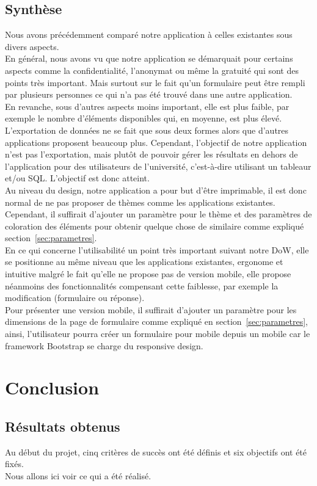 \documentclass{sigplanconf}
\begin{document}
\subsection{Synthèse}
Nous avons précédemment comparé notre application à celles existantes sous divers aspects.\\ En général, nous avons vu que notre application se démarquait pour certains aspects comme la confidentialité, l’anonymat ou même la gratuité qui sont des points très important. Mais surtout sur le fait qu'un formulaire peut être rempli par plusieurs personnes ce qui n'a pas été trouvé dans une autre application.\\
En revanche, sous d’autres aspects moins important, elle est plus faible, par exemple le nombre d’éléments disponibles qui, en moyenne, est plus élevé. L’exportation de données ne se fait que sous deux formes alors que d’autres applications proposent beaucoup plus. Cependant, l’objectif de notre application n’est pas l’exportation, mais plutôt de pouvoir gérer les résultats en dehors de l’application pour des utilisateurs de l'université, c'est-à-dire utilisant un tableaur et/ou SQL. L’objectif est donc atteint. \\
Au niveau du design, notre application a pour but d’être imprimable, il est donc normal de ne pas proposer de thèmes comme les applications existantes. Cependant, il suffirait d'ajouter un paramètre pour le thème et des paramètres de coloration des éléments pour obtenir quelque chose de similaire comme expliqué section~\ref{sec:parametres}.\\
En ce qui concerne l’utilisabilité un point très important suivant notre DoW, elle se positionne au même niveau que les applications existantes, ergonome et intuitive malgré le fait qu’elle ne propose pas de version mobile, elle propose néanmoins des fonctionnalités compensant cette faiblesse, par exemple la modification (formulaire ou réponse).\\
Pour présenter une version mobile, il suffirait d'ajouter un paramètre pour les dimensions de la page de formulaire comme expliqué en section~\ref{sec:parametres}, ainsi, l'utilisateur pourra créer un formulaire pour mobile depuis un mobile car le framework Bootstrap se charge du responsive design.

\section{Conclusion}
\subsection{Résultats obtenus}
Au début du projet, cinq critères de succès ont été définis et six objectifs ont été fixés.\\ 
Nous allons ici voir ce qui a été réalisé. 
\end{document}
